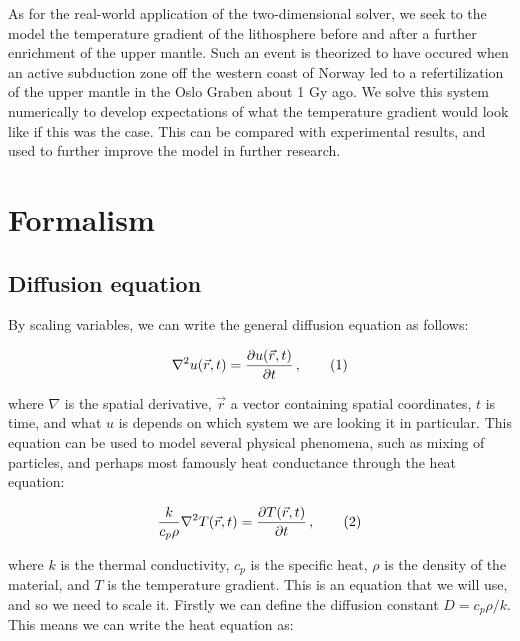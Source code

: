 \documentclass[reprint,english,notitlepage]{revtex4-1}  %
\newcommand\numberthis{\addtocounter{equation}{1}\tag{\theequation}}
\begin{document}
As for the real-world application of the two-dimensional solver, we seek to the model the temperature gradient of the lithosphere before and after a further enrichment of the upper mantle. Such an event is theorized to have occured when an active subduction zone off the western coast of Norway led to a refertilization of the upper mantle in the Oslo Graben about 1 Gy ago. We solve this system numerically to develop expectations of what the temperature gradient would look like if this was the case. This can be compared with experimental results, and used to further improve the model in further research. 


\newpage

\section{Formalism} \label{sec:formalism}

\subsection{Diffusion equation} \label{sec:formalism_diffusion_equation}

By scaling variables, we can write the general diffusion equation as follows:

\begin{align*}
\nabla^2 u(\vec{r},t) = \frac{\partial u(\vec{r},t)}{\partial t} \, , \numberthis \label{eq:3D_diff_eq}
\end{align*}

where $\nabla$ is the spatial derivative, $\vec{r}$ a vector containing spatial coordinates, $t$ is time, and what $u$ is depends on which system we are looking it in particular. This equation can be used to model several physical phenomena, such as mixing of particles, and perhaps most famously heat conductance through the heat equation:

\begin{align*}
\frac{k}{c_p \rho} \nabla^2 T(\vec{r},t) = \frac{\partial T (\vec{r},t)}{\partial t} \, , \numberthis \label{eq:heat_equation_general}
\end{align*}

where $k$ is the thermal conductivity, $c_p$ is the specific heat, $\rho$ is the density of the material, and $T$ is the temperature gradient. This is an equation that we will use, and so we need to scale it. Firstly we can define the diffusion constant $D = c_p \rho / k$. This means we can write the heat equation as:
\end{document}
